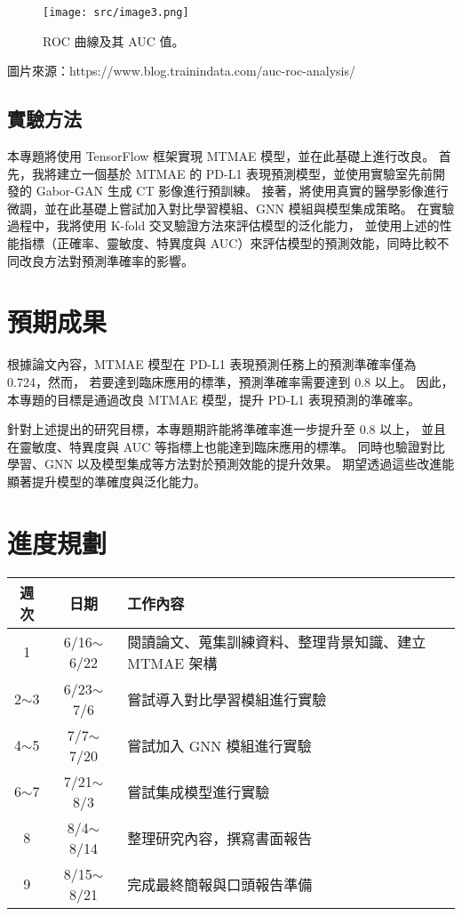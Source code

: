 \documentclass[12pt,a4paper]{article}
\begin{document}
\begin{figure}[H]
  \centering
  \texttt{[image: src/image3.png]}
  \centering
  \caption{ROC 曲線及其 AUC 值。}
  \label{fig:roc-curve}
\end{figure}
圖片來源：https://www.blog.trainindata.com/auc-roc-analysis/

\subsection{實驗方法}
本專題將使用 TensorFlow 框架實現 MTMAE 模型，並在此基礎上進行改良。
首先，我將建立一個基於 MTMAE 的 PD-L1 表現預測模型，並使用實驗室先前開發的 Gabor-GAN 生成 CT 影像進行預訓練。
接著，將使用真實的醫學影像進行微調，並在此基礎上嘗試加入對比學習模組、GNN 模組與模型集成策略。
在實驗過程中，我將使用 K-fold 交叉驗證方法來評估模型的泛化能力，
並使用上述的性能指標（正確率、靈敏度、特異度與 AUC）來評估模型的預測效能，同時比較不同改良方法對預測準確率的影響。

\section{預期成果}
根據論文內容，MTMAE 模型在 PD-L1 表現預測任務上的預測準確率僅為 0.724，然而，
若要達到臨床應用的標準，預測準確率需要達到 0.8 以上。
因此，本專題的目標是通過改良 MTMAE 模型，提升 PD-L1 表現預測的準確率。

針對上述提出的研究目標，本專題期許能將準確率進一步提升至 0.8 以上，
並且在靈敏度、特異度與 AUC 等指標上也能達到臨床應用的標準。
同時也驗證對比學習、GNN 以及模型集成等方法對於預測效能的提升效果。
期望透過這些改進能顯著提升模型的準確度與泛化能力。

\section{進度規劃}
\begin{tabular}{|c|c |l|  }
    \hline
    週次 & 日期 & 工作內容 \\
    \hline\hline
    1 & 6/16$\sim$6/22 & 閱讀論文、蒐集訓練資料、整理背景知識、建立 MTMAE 架構 \\
    \hline
    2$\sim$3 & 6/23$\sim$7/6 & 嘗試導入對比學習模組進行實驗 \\
    \hline
    4$\sim$5 & 7/7$\sim$7/20 & 嘗試加入 GNN 模組進行實驗 \\
    \hline
    6$\sim$7 & 7/21$\sim$8/3 & 嘗試集成模型進行實驗 \\
    \hline
    8 & 8/4$\sim$8/14 & 整理研究內容，撰寫書面報告 \\
    \hline
    9 & 8/15$\sim$8/21 & 完成最終簡報與口頭報告準備 \\
    \hline
\end{tabular}
\end{document}
